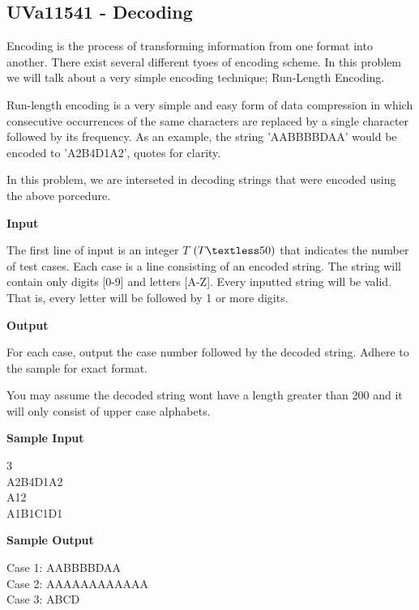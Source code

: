 \subsection{UVa11541 - Decoding}
Encoding is the process of transforming information from one format into another. There exist several different tyoes of encoding scheme. In this problem we will talk about a very simple encoding technique; Run-Length Encoding.

Run-length encoding is a very simple and easy form of data compression in which consecutive occurrences of the same characters are replaced by a single character followed by its frequency. As an example, the string 'AABBBBDAA' would be encoded to 'A2B4D1A2', quotes for clarity.

In this problem, we are interseted in decoding strings that were encoded using the above porcedure.

\begin{flushleft}
{\color{red} \textbf{Input}}
\end{flushleft}
The first line of input is an integer $T$ $ (T \textless 50)$ that indicates the number of test cases. Each case is a line consisting of an encoded string. The string will contain only digits [0-9] and letters [A-Z]. Every inputted string will be valid. That is, every letter will be followed by 1 or more digits.

\begin{flushleft}
{\color{red} \textbf{Output}}
\end{flushleft}
For each case, output the case number followed by the decoded string. Adhere to the sample for exact format.

You may assume the decoded string wont have a length greater than 200 and it will only consist of upper case alphabets.

\begin{flushleft}
{\color{red} \textbf{Sample Input}}
\end{flushleft}
\begin{flushleft}
3\\
A2B4D1A2\\
A12\\
A1B1C1D1\\
\end{flushleft}

\begin{flushleft}
{\color{red} \textbf{Sample Output}}
\end{flushleft}
\begin{flushleft}
Case 1: AABBBBDAA\\
Case 2: AAAAAAAAAAAA\\
Case 3: ABCD\\
\end{flushleft}

\newpage